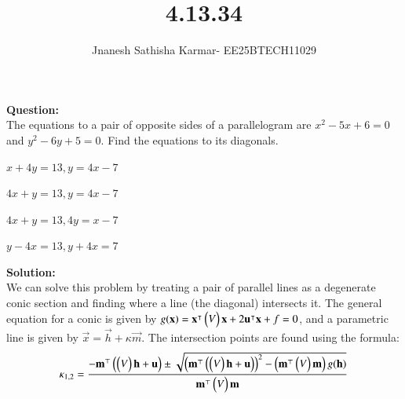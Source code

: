 \documentclass[journal]{IEEEtran}
\theoremstyle{remark}
\begin{document}
\setlength{\abovedisplayskip}{0pt}
\setlength{\belowdisplayskip}{0pt}
\setlength{\abovedisplayshortskip}{0pt}
\setlength{\belowdisplayshortskip}{0pt}

\onecolumn

\title{4.13.34}
\author{Jnanesh Sathisha Karmar- EE25BTECH11029}
\maketitle


\renewcommand{\thefigure}{\theenumi}
\renewcommand{\thetable}{\theenumi}

\textbf{Question:} \\
The equations to a pair of opposite sides of a parallelogram are $x^2 - 5x + 6 = 0$ and $y^2 - 6y + 5 = 0$. Find the equations to its diagonals.
\begin{enumerate}
\begin{multicols}{2}
    \item $x+4y=13,y=4x-7$
    \item $4x+y=13,y=4x-7$
    \item $4x+y=13,4y=x-7$
    \item $y-4x=13,y+4x=7$
\end{multicols}
\end{enumerate}

\vspace{0.5cm}

\noindent
\textbf{Solution:} \\
We can solve this problem by treating a pair of parallel lines as a degenerate conic section and finding where a line (the diagonal) intersects it. The general equation for a conic is given by $g(\mathbf{x}) = \mathbf{x}^\intercal \begin{pmatrix}V\end{pmatrix} \mathbf{x} + 2\mathbf{u}^\intercal \mathbf{x} + f = 0$, and a parametric line is given by $\vec{x} = \vec{h} + \kappa\vec{m}$. The intersection points are found using the formula:
\noindent
\begin{align}
\kappa_{1,2} = \frac{-\mathbf{m}^{\top} \left(\begin{pmatrix}V\end{pmatrix}\mathbf{h} + \mathbf{u}\right) \pm \sqrt{\left(\mathbf{m}^{\top} \left(\begin{pmatrix}V\end{pmatrix}\mathbf{h} + \mathbf{u}\right)\right)^2 - \left(\mathbf{m}^{\top} \begin{pmatrix}V\end{pmatrix} \mathbf{m}\right) g(\mathbf{h})}}{\mathbf{m}^{\top} \begin{pmatrix}V\end{pmatrix} \mathbf{m}}
\end{align}
\end{document}
